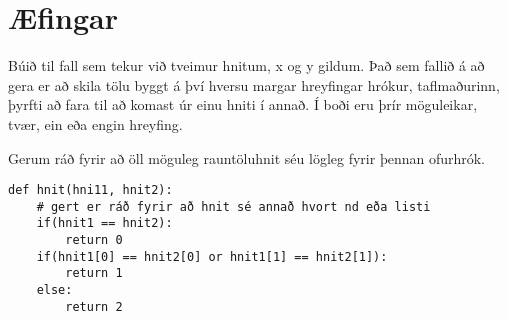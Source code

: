



\newpage
\section{Æfingar}
\begin{exercise}\label{rei1}
Búið til fall sem tekur við tveimur hnitum, x og y gildum.
Það sem fallið á að gera er að skila tölu byggt á því hversu margar hreyfingar hrókur, taflmaðurinn, þyrfti að fara til að komast úr einu hniti í annað.
Í boði eru þrír möguleikar, tvær, ein eða engin hreyfing.

Gerum ráð fyrir að öll möguleg rauntöluhnit séu lögleg fyrir þennan ofurhrók.
\end{exercise}
\begin{Answer}[ref={rei1}]
	\begin{lstlisting}
def hnit(hni11, hnit2):
	# gert er ráð fyrir að hnit sé annað hvort nd eða listi
	if(hnit1 == hnit2):
		return 0
	if(hnit1[0] == hnit2[0] or hnit1[1] == hnit2[1]):
		return 1
	else:
		return 2\end{lstlisting}
\end{Answer}

